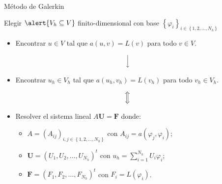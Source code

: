 \begin{frame}{Método de Galerkin}
	\begin{block}{}
	\begin{center}
	Elegir $\alert{V_h\subseteq V}$ finito-dimensional con base $\left\{\varphi_i\right\}_{i\in\left\{1,2,\ldots,N_h \right\}}$
	\end{center}
	\end{block}
	
	\vspace*{-0.3cm}
	\begin{itemize}
	\item Encontrar $u\in V$ tal que $a(u,v)=L(v)$ para todo $v\in V$.
	\end{itemize}
	\vspace*{0.1cm}
	$$\Big{\downarrow}$$
	\vspace*{-0.3cm}
	\begin{itemize}
	\item Encontrar $u_h\in V_h$ tal que $a(u_h,v_h)=L(v_h)$ para todo $v_h\in V_h$.
	\end{itemize}
	\vspace*{0.1cm}
	$$\Big{\Updownarrow}$$
	\vspace*{-0.3cm}
	\begin{itemize}
	\item Resolver el sistema lineal $A\mathbf{U}=\mathbf{F}$ donde:
	\vspace*{0.3cm}
	\begin{itemize}
		\item $A=\left(A_{i j}\right)_{i, j\in\left\{1,2,\ldots,N_h\right\}}$ con $A_{i j}=a(\varphi_j,\varphi_i)$;
		\item $\mathbf{U}=\left(U_1,U_2,\ldots,U_{N_h}\right)^t$ con $u_h=\displaystyle\sum_{i=1}^{N_h}U_i\varphi_i$;
		\item $\mathbf{F}=\left(F_1,F_2,\ldots,F_{N_h}\right)^t$ con $F_i=L\left(\varphi_i\right)$.
	\end{itemize}
	\end{itemize}
\end{frame}
	
	
